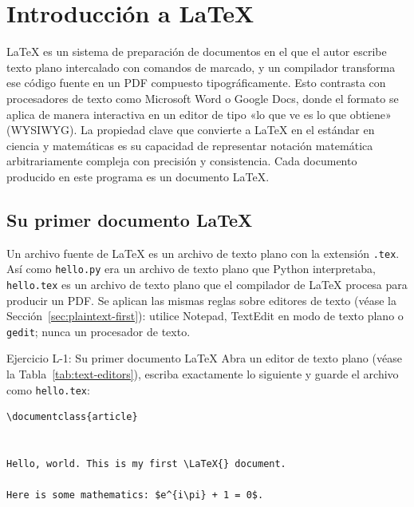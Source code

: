 \chapter{Introducción a \LaTeX{}}
\label{ch:latex}

\LaTeX{} es un sistema de preparación de documentos en el que el autor
escribe texto plano intercalado con comandos de marcado, y un
compilador transforma ese código fuente en un PDF compuesto
tipográficamente. Esto contrasta con procesadores de texto como
Microsoft Word o Google Docs, donde el formato se aplica de manera
interactiva en un editor de tipo «lo que ve es lo que obtiene»
(WYSIWYG). La propiedad clave que convierte a \LaTeX{} en el estándar
en ciencia y matemáticas es su capacidad de representar notación
matemática arbitrariamente compleja con precisión y consistencia. Cada
documento producido en este programa es un documento \LaTeX{}.

\section{Su primer documento \LaTeX{}}
\label{sec:first-latex-doc}

Un archivo fuente de \LaTeX{} es un archivo de texto plano con la
extensión \texttt{.tex}. Así como \texttt{hello.py} era un archivo de
texto plano que Python interpretaba, \texttt{hello.tex} es un archivo
de texto plano que el compilador de \LaTeX{} procesa para producir un
PDF. Se aplican las mismas reglas sobre editores de texto (véase la
Sección~\ref{sec:plaintext-first}): utilice Notepad, TextEdit en modo
de texto plano o \texttt{gedit}; nunca un procesador de texto.

\begin{infobox}{Ejercicio L-1: Su primer documento \LaTeX{}}
Abra un editor de texto plano (véase la
Tabla~\ref{tab:text-editors}), escriba exactamente lo siguiente y
guarde el archivo como \texttt{hello.tex}:

\begin{lstlisting}[style=inlineStyle]
\documentclass{article}


Hello, world. This is my first \LaTeX{} document.

Here is some mathematics: $e^{i\pi} + 1 = 0$.


\end{lstlisting}
\end{infobox}

